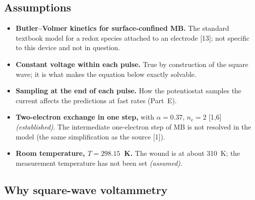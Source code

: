 \documentclass[10pt,a4paper]{article}
\numberwithin{equation}{section}
\newcommand{\cit}[1]{[#1]}
\newcommand{\FLAG}{\textit{(assumed)}}
\newcommand{\CONF}{\textit{(established)}}
\newenvironment{assump}{\small}{\smallskip}
\begin{document}
\subsection{Assumptions}

\begin{assump}
\begin{itemize}[leftmargin=*]
\item \textbf{Butler--Volmer kinetics for surface-confined MB.} The standard
  textbook model for a redox species attached to an electrode \cit{13}; not
  specific to this device and not in question.
\item \textbf{Constant voltage within each pulse.} True by construction of the
  square wave; it is what makes the equation below exactly solvable.
\item \textbf{Sampling at the end of each pulse.} How the potentiostat samples the current
  affects the predictions at fast rates (Part~E).
\item \textbf{Two-electron exchange in one step,} with $\alpha=0.37$, $n_e=2$
  \cit{1,6} \CONF. The intermediate one-electron step of MB is not resolved in the model
  (the same simplification as the source \cit{1}).
\item \textbf{Room temperature, $T=298.15$~K.} The wound is at about 310~K; the
  measurement temperature has not been set \FLAG.
\end{itemize}
\end{assump}

\subsection{Why square-wave voltammetry}
\end{document}
